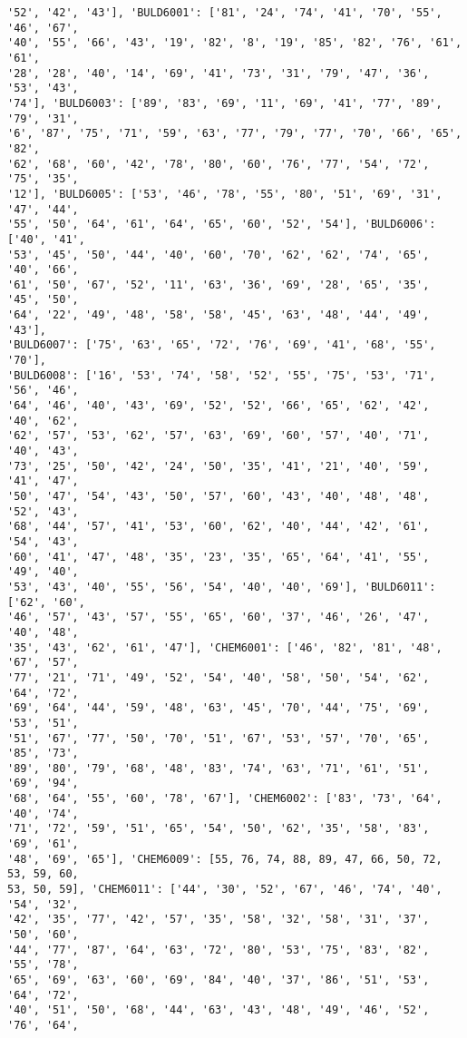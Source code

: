 \documentclass[11pt]{article}
\begin{document}
\begin{Verbatim}[commandchars=\\\{\}]
'52', '42', '43'], 'BULD6001': ['81', '24', '74', '41', '70', '55', '46', '67',
'40', '55', '66', '43', '19', '82', '8', '19', '85', '82', '76', '61', '61',
'28', '28', '40', '14', '69', '41', '73', '31', '79', '47', '36', '53', '43',
'74'], 'BULD6003': ['89', '83', '69', '11', '69', '41', '77', '89', '79', '31',
'6', '87', '75', '71', '59', '63', '77', '79', '77', '70', '66', '65', '82',
'62', '68', '60', '42', '78', '80', '60', '76', '77', '54', '72', '75', '35',
'12'], 'BULD6005': ['53', '46', '78', '55', '80', '51', '69', '31', '47', '44',
'55', '50', '64', '61', '64', '65', '60', '52', '54'], 'BULD6006': ['40', '41',
'53', '45', '50', '44', '40', '60', '70', '62', '62', '74', '65', '40', '66',
'61', '50', '67', '52', '11', '63', '36', '69', '28', '65', '35', '45', '50',
'64', '22', '49', '48', '58', '58', '45', '63', '48', '44', '49', '43'],
'BULD6007': ['75', '63', '65', '72', '76', '69', '41', '68', '55', '70'],
'BULD6008': ['16', '53', '74', '58', '52', '55', '75', '53', '71', '56', '46',
'64', '46', '40', '43', '69', '52', '52', '66', '65', '62', '42', '40', '62',
'62', '57', '53', '62', '57', '63', '69', '60', '57', '40', '71', '40', '43',
'73', '25', '50', '42', '24', '50', '35', '41', '21', '40', '59', '41', '47',
'50', '47', '54', '43', '50', '57', '60', '43', '40', '48', '48', '52', '43',
'68', '44', '57', '41', '53', '60', '62', '40', '44', '42', '61', '54', '43',
'60', '41', '47', '48', '35', '23', '35', '65', '64', '41', '55', '49', '40',
'53', '43', '40', '55', '56', '54', '40', '40', '69'], 'BULD6011': ['62', '60',
'46', '57', '43', '57', '55', '65', '60', '37', '46', '26', '47', '40', '48',
'35', '43', '62', '61', '47'], 'CHEM6001': ['46', '82', '81', '48', '67', '57',
'77', '21', '71', '49', '52', '54', '40', '58', '50', '54', '62', '64', '72',
'69', '64', '44', '59', '48', '63', '45', '70', '44', '75', '69', '53', '51',
'51', '67', '77', '50', '70', '51', '67', '53', '57', '70', '65', '85', '73',
'89', '80', '79', '68', '48', '83', '74', '63', '71', '61', '51', '69', '94',
'68', '64', '55', '60', '78', '67'], 'CHEM6002': ['83', '73', '64', '40', '74',
'71', '72', '59', '51', '65', '54', '50', '62', '35', '58', '83', '69', '61',
'48', '69', '65'], 'CHEM6009': [55, 76, 74, 88, 89, 47, 66, 50, 72, 53, 59, 60,
53, 50, 59], 'CHEM6011': ['44', '30', '52', '67', '46', '74', '40', '54', '32',
'42', '35', '77', '42', '57', '35', '58', '32', '58', '31', '37', '50', '60',
'44', '77', '87', '64', '63', '72', '80', '53', '75', '83', '82', '55', '78',
'65', '69', '63', '60', '69', '84', '40', '37', '86', '51', '53', '64', '72',
'40', '51', '50', '68', '44', '63', '43', '48', '49', '46', '52', '76', '64',

\end{Verbatim}
\end{document}
